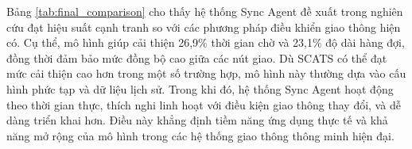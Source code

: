 Bảng \ref{tab:final_comparison} cho thấy hệ thống Sync Agent đề xuất trong nghiên cứu đạt hiệu suất cạnh tranh so với các phương pháp điều khiển giao thông hiện có. Cụ thể, mô hình giúp cải thiện 26,9\% thời gian chờ và 23,1\% độ dài hàng đợi, đồng thời đảm bảo mức đồng bộ cao giữa các nút giao. Dù SCATS có thể đạt mức cải thiện cao hơn trong một số trường hợp, mô hình này thường dựa vào cấu hình phức tạp và dữ liệu lịch sử. Trong khi đó, hệ thống Sync Agent hoạt động theo thời gian thực, thích nghi linh hoạt với điều kiện giao thông thay đổi, và dễ dàng triển khai hơn. Điều này khẳng định tiềm năng ứng dụng thực tế và khả năng mở rộng của mô hình trong các hệ thống giao thông thông minh hiện đại.